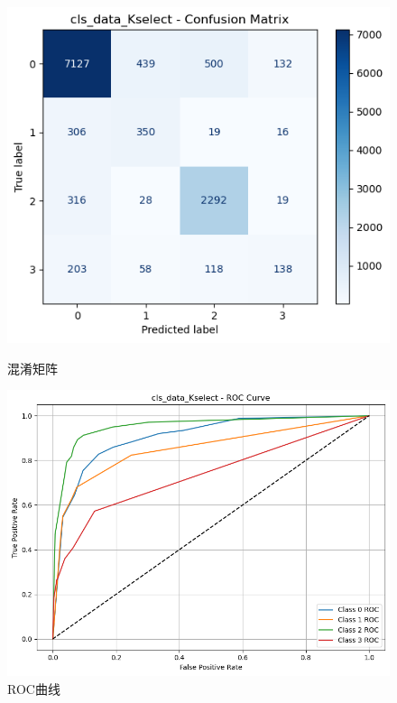\documentclass[10pt]{article}
\begin{document}
\begin{figure}[H]
\centering
\begin{minipage}[t]{0.45\textwidth}
  \centering
  \includegraphics[width=\linewidth]{cls_knn_10s.png}
  \caption{混淆矩阵}
  \label{fig:26}
\end{minipage}
\hfill
\begin{minipage}[t]{0.52\textwidth}
  \centering
  \includegraphics[width=\linewidth]{cls_knn_10s2.png}
  \caption{ROC曲线}
  \label{fig:27}
\end{minipage}
\end{figure}
\end{document}
